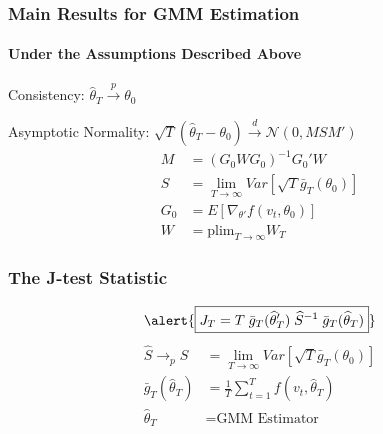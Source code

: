 \begin{frame}
  \frametitle{Main Results for GMM Estimation}
  \framesubtitle{Under the Assumptions Described Above}

\begin{alertblock}{Consistency: $\widehat{\theta}_T \overset{p}{\rightarrow} \theta_0$}
  \end{alertblock}

  \begin{alertblock}{Asymptotic Normality: $\sqrt{T} (\widehat{\theta}_T - \theta_0)\overset{d}{\rightarrow} \mathcal{N}(0,MSM')$}
    \small
    \vspace{-1em}
	\begin{align*}
		M &= (G_0 W G_0)^{-1} G_0'W\\
    S &= \underset{T\rightarrow \infty}{\lim} Var\left[\sqrt{T}\bar{g}_T(\theta_0)\right]\\
		G_0 &= E[\nabla_{\theta'} f(v_t, \theta_0)]\\
    W &= \mbox{plim}_{T\rightarrow \infty} W_T
	\end{align*}
  \end{alertblock}
  \normalsize
\end{frame}
\begin{frame}
  \frametitle{The J-test Statistic}
	\[
    \alert{\boxed{J_T = T\; \bar{g}_T(\widehat{\theta}_T')\; \widehat{S}^{-1} \;\bar{g}_T(\widehat{\theta}_T)}}
  \]
  \footnotesize
  \begin{align*}
    \widehat{S} \rightarrow_p S &= \underset{T\rightarrow \infty}{\lim} Var\left[\sqrt{T}\bar{g}_T(\theta_0)\right]\\
    \bar{g}_T(\widehat{\theta}_T) &= \frac{1}{T} \sum_{t=1}^T f(v_t, \widehat{\theta}_T)\\
    \widehat{\theta}_T &= \mbox{GMM Estimator}
  \end{align*}
  \normalsize


\end{frame}
